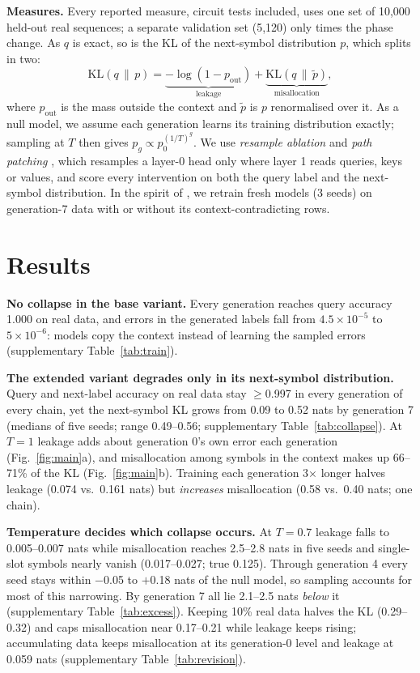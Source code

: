 \documentclass[10pt,letterpaper]{article}
\begin{document}
\textbf{Measures.} Every reported measure, circuit tests included, uses one set of 10{,}000 held-out real sequences; a separate validation set (5{,}120) only times the phase change. As $q$ is exact, so is the KL of the next-symbol distribution $p$, which splits in two:
\begin{equation}
\mathrm{KL}(q\,\|\,p) = \underbrace{-\log(1-p_\text{out})}_{\text{leakage}} + \underbrace{\mathrm{KL}(q\,\|\,\tilde p)}_{\text{misallocation}},
\label{eq:split}
\end{equation}
where $p_\text{out}$ is the mass outside the context and $\tilde p$ is $p$ renormalised over it. As a null model, we assume each generation learns its training distribution exactly; sampling at $T$ then gives $p_g \propto p_0^{(1/T)^g}$. We use \emph{resample ablation} \citep{conmy2023automated} and \emph{path patching} \citep{goldowskydill2023localizing}, which resamples a layer-0 head only where layer 1 reads queries, keys or values, and score every intervention on both the query label and the next-symbol distribution. In the spirit of \citet{chen2026mechanistic}, we retrain fresh models (3 seeds) on generation-7 data with or without its context-contradicting rows.

\section{Results}
\textbf{No collapse in the base variant.} Every generation reaches query accuracy 1.000 on real data, and errors in the generated labels fall from $4.5{\times}10^{-5}$ to $5{\times}10^{-6}$: models copy the context instead of learning the sampled errors (supplementary Table~\ref{tab:train}).

\textbf{The extended variant degrades only in its next-symbol distribution.} Query and next-label accuracy on real data stay $\geq$0.997 in every generation of every chain, yet the next-symbol KL grows from 0.09 to 0.52 nats by generation 7 (medians of five seeds; range 0.49--0.56; supplementary Table~\ref{tab:collapse}). At $T{=}1$ leakage adds about generation 0's own error each generation (Fig.~\ref{fig:main}a), and misallocation among symbols in the context makes up 66--71\% of the KL (Fig.~\ref{fig:main}b). Training each generation 3$\times$ longer halves leakage (0.074 vs.\ 0.161 nats) but \emph{increases} misallocation (0.58 vs.\ 0.40 nats; one chain).

\textbf{Temperature decides which collapse occurs.} At $T{=}0.7$ leakage falls to 0.005--0.007 nats while misallocation reaches 2.5--2.8 nats in five seeds and single-slot symbols nearly vanish (0.017--0.027; true 0.125). Through generation 4 every seed stays within $-$0.05 to $+$0.18 nats of the null model, so sampling accounts for most of this narrowing. By generation 7 all lie 2.1--2.5 nats \emph{below} it (supplementary Table~\ref{tab:excess}). Keeping 10\% real data halves the KL (0.29--0.32) and caps misallocation near 0.17--0.21 while leakage keeps rising; accumulating data keeps misallocation at its generation-0 level and leakage at 0.059 nats (supplementary Table~\ref{tab:revision}).
\end{document}
